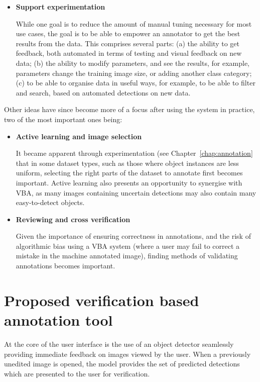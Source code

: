 \begin{itemize}
\item {\bf Support experimentation} \par
While one goal is to reduce the amount of manual tuning necessary for most use cases, the goal is to be able to empower an annotator to get the best results from the data. This comprises  several parts: (a) the ability to get feedback, both automated in terms of testing and visual feedback on new data; (b) the ability to modify parameters, and see the results, for example, parameters change the training image size, or adding another class category; (c) to be able to organise data in useful ways, for example, to be able to filter and search, based on automated detections on new data.

\end{itemize}


Other ideas have since become more of a focus after using the system in practice, two of the most important ones being:

\begin{itemize}

\item {\bf Active learning and image selection} \par

It became apparent through experimentation (see Chapter~\ref{chap:annotation} that in some dataset types, such as those where object instances are less uniform, selecting the right parts of the dataset to annotate first becomes important. Active learning also presents an opportunity to synergise with \gls{VBA}, as many images containing uncertain detections may also contain many easy-to-detect objects.

\item {\bf Reviewing and cross verification} \par

Given the importance of ensuring correctness in annotations, and the risk of algorithmic bias using a \gls{VBA} system (where a user may fail to correct a mistake in the machine annotated image), finding methods of validating annotations becomes important. 

\end{itemize}


\section {Proposed verification based annotation tool}

At the core of the user interface is the use of an object detector seamlessly providing immediate feedback on images viewed by the user. When a previously unedited image is opened, the model provides the set of predicted detections which are presented to the user for verification. 

